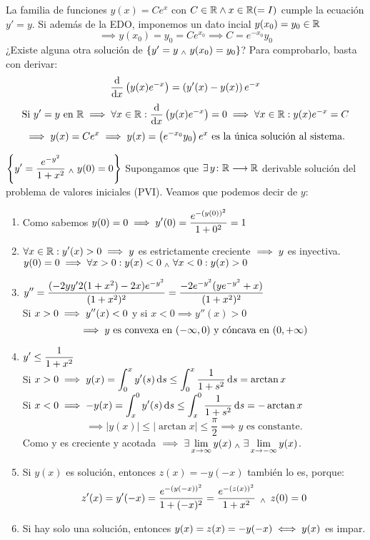 \begin{ejem}
    La familia de funciones $y(x)=Ce^x$ con $C\in \mathbb{R} \wedge x\in \mathbb{R} (=I)$ cumple la ecuación $y'=y$. Si además de la EDO, imponemos un dato incial $y(x_0)=y_0 \in \mathbb{R}$
    \[\implies y(x_0)=y_0=Ce^{x_0} \implies C=e^{-x_0}y_0\]
    ¿Existe alguna otra solución de $\{y'=y \; _{\wedge} \; y(x_0)=y_0\}$?
    Para comprobarlo, basta con derivar:
    \[\odv{}{x}\left(y(x)e^{-x}\right)=\left(y'(x) - y(x)\right)e^{-x}\]
    \[\tex{Si } y'=y \tex{ en } \R \implies \forall x \in \R : \odv{}{x}\left(y(x)e^{-x}\right)=0 \implies \forall x \in \R : y(x)e^{-x} = C\]
    \[\implies y(x)=Ce^x \implies y(x)=\left(e^{-x_0}y_0\right)e^x \text{ es la única solución al sistema.}\]
\end{ejem}

\begin{ejem}
    $\displaystyle \left\{y' = \frac{e^{-y^2}}{1+x^2} \; _{\wedge} \; y(0)=0\right\}$
    Supongamos que $\displaystyle\exists\,y \colon \mathbb{R} \longrightarrow \mathbb{R}$ derivable solución del problema de valores iniciales (PVI). Veamos que podemos decir de $y$:
    \begin{enumerate}
        \item Como sabemos $\displaystyle y(0)=0 \implies y'(0)=\frac{e^{-(y(0))^2}}{1+0^2}=1$
        \item $\displaystyle \forall x \in \mathbb{R} : y'(x)>0 \implies y$ es estrictamente creciente $\displaystyle\implies y$ es inyectiva. \\
        $\displaystyle y(0)=0 \implies \forall x>0 : y(x)<0 \; _{\wedge} \; \forall x<0 : y(x)>0$
        \item $\displaystyle y''=\frac{(-2yy'2(1+x^2)-2x)e^{-y^2}}{(1+x^2)^2}=\frac{-2e^{-y^2}(ye^{-y^2}+x)}{(1+x^2)^2}$ \\
        Si $\displaystyle x>0 \implies y''(x)<0$ y si $x<0 \implies y''(x)>0$
        \[ \implies y \text{ es convexa en } (-\infty, 0) \text{ y cóncava en }(0, +\infty)\]
        \item $\displaystyle y' \leq \frac{1}{1+x^2}$ \\
        Si $\ds x>0 \implies y(x)=\int_0^x y'(s)\odif{s}\leq\int_0^x \frac{1}{1+s^2}\odif{s}=\arctan{x}$ \\
        Si $\ds x<0 \implies -y(x)=\int_x^0 y'(s)\odif{s}\leq\int_x^0 \frac{1}{1+s^2}\odif{s}=-\arctan{x}$ \\
        \[\implies |y(x)| \leq |\arctan{x}| \leq \frac{\pi}{2} \implies y \text{ es constante.}\]
        Como y es creciente y acotada $\displaystyle\implies \exists\lim_{x\to\infty} y(x) \; _{\wedge} \; \exists\lim_{x\to-\infty} y(x)$.
        \item Si $y(x)$ es solución, entonces $z(x)=-y(-x)$ también lo es, porque:
        \[z'(x)=y'(-x)=\frac{e^{-(y(-x))^2}}{1+(-x)^2}=\frac{e^{-(z(x))^2}}{1+x^2} \,\; _{\wedge} \; \, z(0)=0\]
        \item Si hay solo una solución, entonces $\displaystyle y(x)=z(x)=-y(-x)\iff y(x)$ es impar.
    \end{enumerate}
    \ifdraft{\vspace{5cm}}{}
\end{ejem}
